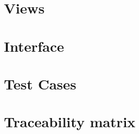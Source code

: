 \documentclass[12pt]{article}
\renewcommand{\c}{\checkmark}
\newcommand{\s}[1] {\begin{sideways}#1\end{sideways}}
\begin{document}
\section{Views}

\section{Interface}

\section{Test Cases}


\section{Traceability matrix}
\begin{center}
\begin{comment}
\begin{tabular}{|l||*{12}{c|}|*{4}{c|}}
\hline
\multicolumn{1}{|c||}{ }&
\multicolumn{12}{|c||}{Functional} &
\multicolumn{4}{|c|}{Non-functional}\\
\hline
	& \s{ss3333} & \\
\hline
\hline
~\ref{sec:Update timing}	&	\c \\
\hline
\end{tabular}
\end{comment}
\end{center}
\end{document}
